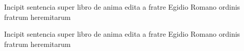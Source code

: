 \documentclass{article}
\begin{document}
\begin{pairs}
  \begin{Leftside}
    \beginnumbering

    \pstart
    Incipit sentencia super libro de
    anima edita a fratre Egidio Romano ordinis fratrum heremitarum
    \pend

    \endnumbering
  \end{Leftside}

  \begin{Rightside}
    \beginnumbering

    \pstart
    Incipit sentencia super libro de
    anima edita a fratre Egidio Romano ordinis fratrum heremitarum
    \pend

    \endnumbering
  \end{Rightside}
\end{pairs}
\Columns
\end{document}
